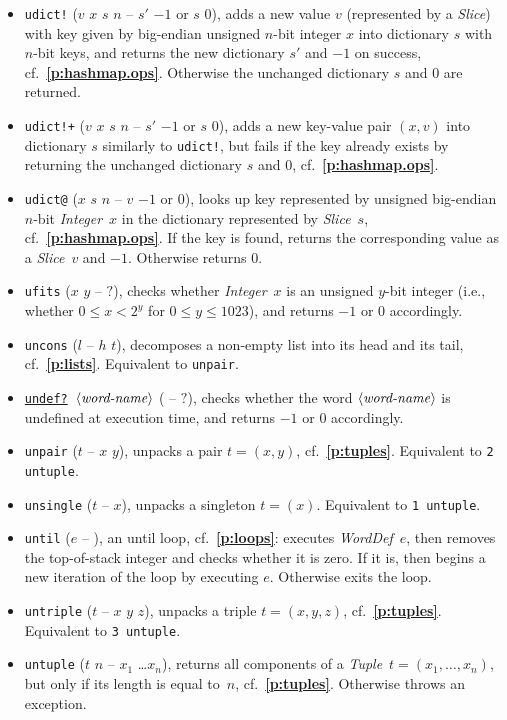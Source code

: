 \documentclass[12pt,oneside]{article}
\def\refpoint#1{{\rm\textbf{\ref{#1}}}}
\let\ptref=\refpoint
\begin{document}
\begin{itemize}
\item {\tt udict!} ($v$ $x$ $s$ $n$ -- $s'$ $-1$ or $s$ $0$), adds a new value $v$ (represented by a {\em Slice\/}) with key given by big-endian unsigned $n$-bit integer $x$ into dictionary $s$ with $n$-bit keys, and returns the new dictionary $s'$ and $-1$ on success, cf.~\ptref{p:hashmap.ops}. Otherwise the unchanged dictionary $s$ and $0$ are returned.
\item {\tt udict!+} ($v$ $x$ $s$ $n$ -- $s'$ $-1$ or $s$ $0$), adds a new key-value pair $(x,v)$ into dictionary $s$ similarly to {\tt udict!}, but fails if the key already exists by returning the unchanged dictionary $s$ and $0$, cf.~\ptref{p:hashmap.ops}.
\item {\tt udict@} ($x$ $s$ $n$ -- $v$ $-1$ or $0$), looks up key represented by unsigned big-endian $n$-bit {\em Integer\/}~$x$ in the dictionary represented by {\em Slice\/}~$s$, cf.~\ptref{p:hashmap.ops}. If the key is found, returns the corresponding value as a {\em Slice\/}~$v$ and $-1$. Otherwise returns $0$.
\item {\tt ufits} ($x$ $y$ -- $?$), checks whether {\em Integer\/}~$x$ is an unsigned $y$-bit integer (i.e., whether $0\leq x<2^y$ for $0\leq y\leq 1023$), and returns $-1$ or $0$ accordingly.
\item {\tt uncons} ($l$ -- $h$ $t$), decomposes a non-empty list into its head and its tail, cf.~\ptref{p:lists}. Equivalent to {\tt unpair}.
\item {\tt \underline{undef?} $\langle\textit{word-name\/}\rangle$} ( -- $?$), checks whether the word $\langle\textit{word-name\/}\rangle$ is undefined at execution time, and returns $-1$ or $0$ accordingly.
\item {\tt unpair} ($t$ -- $x$ $y$), unpacks a pair $t=(x,y)$, cf.~\ptref{p:tuples}. Equivalent to {\tt 2 untuple}.
\item {\tt unsingle} ($t$ -- $x$), unpacks a singleton $t=(x)$. Equivalent to {\tt 1 untuple}.
\item {\tt until} ($e$ -- ), an until loop, cf.~\ptref{p:loops}: executes {\em WordDef\/}~$e$, then removes the top-of-stack integer and checks whether it is zero. If it is, then begins a new iteration of the loop by executing $e$. Otherwise exits the loop.
\item {\tt untriple} ($t$ -- $x$ $y$ $z$), unpacks a triple $t=(x,y,z)$, cf.~\ptref{p:tuples}. Equivalent to {\tt 3 untuple}.
\item {\tt untuple} ($t$ $n$ -- $x_1$ \dots $x_n$), returns all components of a {\em Tuple\/}~$t=(x_1,\ldots,x_n)$, but only if its length is equal to~$n$, cf.~\ptref{p:tuples}. Otherwise throws an exception.

\end{itemize}
\end{document}
